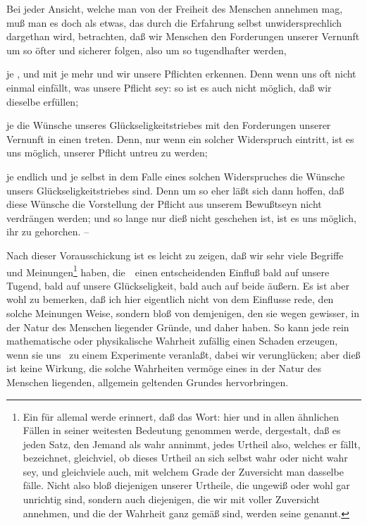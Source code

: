 \begin{aufza}
\item Bei jeder Ansicht, welche man von der Freiheit des Menschen annehmen mag, muß man es doch als etwas, das durch die Erfahrung selbst unwidersprechlich dargethan wird, betrachten, daß wir Menschen den Forderungen unserer Vernunft um so öfter und sicherer folgen, also um so tugendhafter werden,
\begin{aufzb}
\item je , und mit je mehr  und  wir unsere Pflichten erkennen. Denn wenn uns oft nicht einmal einfällt, was unsere Pflicht sey: so ist es auch nicht möglich, daß wir dieselbe erfüllen;
\item je  die Wünsche unseres Glückseligkeitstriebes mit den Forderungen unserer Vernunft in einen  treten. Denn, nur wenn ein solcher Widerspruch eintritt, ist es uns möglich, unserer Pflicht untreu zu werden;
\item je  endlich und je  selbst in dem Falle eines solchen Widerspruches die Wünsche unsers Glückseligkeitstriebes sind. Denn um so eher läßt sich dann hoffen, daß diese Wünsche die Vorstellung der Pflicht aus unserem Bewußtseyn nicht verdrängen werden; und so lange nur dieß nicht geschehen ist, ist es uns möglich, ihr zu gehorchen. --
\end{aufzb}
\item Nach dieser Vorausschickung ist es leicht zu zeigen, daß wir sehr viele Begriffe und Meinungen\footnote{%
	Ein für allemal werde erinnert, daß das Wort:  hier und in allen ähnlichen Fällen in seiner weitesten Bedeutung genommen werde, dergestalt, daß es jeden Satz, den Jemand als wahr annimmt, jedes Urtheil also, welches er fällt, bezeichnet, gleichviel, ob dieses Urtheil an sich selbst wahr oder nicht wahr sey, und gleichviele auch, mit welchem Grade der Zuversicht man dasselbe fälle. Nicht also bloß diejenigen unserer Urtheile, die ungewiß oder wohl gar unrichtig sind, sondern auch diejenigen, die wir mit voller Zuversicht annehmen, und die der Wahrheit ganz gemäß sind, werden seine  genannt.}
haben, die~\ einen entscheidenden Einfluß bald auf unsere Tugend, bald auf unsere Glückseligkeit, bald auch auf beide äußern. Es ist aber wohl zu bemerken, daß ich hier eigentlich nicht von dem Einflusse rede, den solche Meinungen  Weise, sondern bloß von demjenigen, den sie wegen gewisser, in der Natur des Menschen liegender Gründe, und daher  haben. So kann jede rein mathematische oder physikalische Wahrheit zufällig einen Schaden erzeugen, wenn sie uns \zB\ zu einem Experimente veranlaßt, dabei wir verunglücken; aber dieß ist keine Wirkung, die solche Wahrheiten vermöge eines in der Natur des Menschen liegenden, allgemein geltenden Grundes hervorbringen.

\end{aufza}
